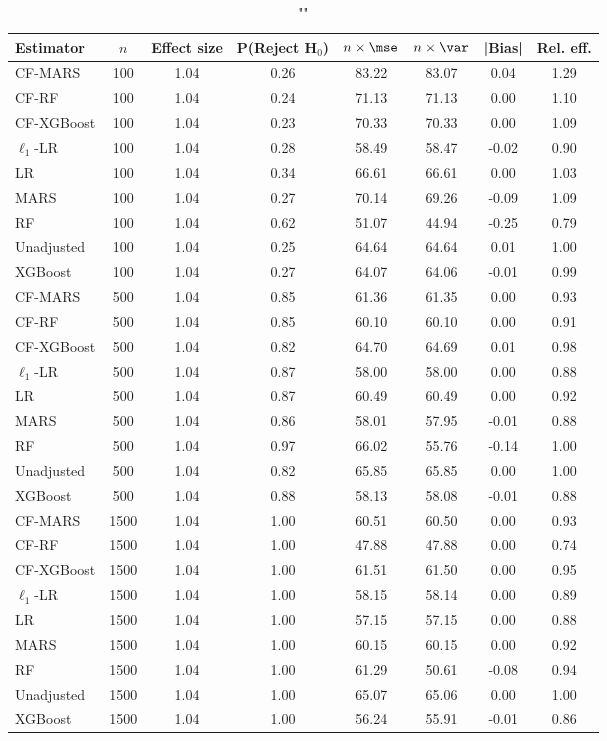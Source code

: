 
\begin{table}
\centering
\caption{""}
\begin{tabular}{lccccccc}
\toprule
Estimator & $n$ & Effect size & P(Reject H$_0$) & $n\times\mse$ & $n\times \var$ & |Bias| & Rel. eff.\\ \midrule
CF-MARS & 100 & 1.04 & 0.26 & 83.22 & 83.07 &  0.04 & 1.29 \\ 
CF-RF & 100 & 1.04 & 0.24 & 71.13 & 71.13 &  0.00 & 1.10 \\ 
CF-XGBoost & 100 & 1.04 & 0.23 & 70.33 & 70.33 &  0.00 & 1.09 \\ 
$\ell_1$-LR & 100 & 1.04 & 0.28 & 58.49 & 58.47 & -0.02 & 0.90 \\ 
LR & 100 & 1.04 & 0.34 & 66.61 & 66.61 &  0.00 & 1.03 \\ 
MARS & 100 & 1.04 & 0.27 & 70.14 & 69.26 & -0.09 & 1.09 \\ 
RF & 100 & 1.04 & 0.62 & 51.07 & 44.94 & -0.25 & 0.79 \\ 
Unadjusted & 100 & 1.04 & 0.25 & 64.64 & 64.64 &  0.01 & 1.00 \\ 
XGBoost & 100 & 1.04 & 0.27 & 64.07 & 64.06 & -0.01 & 0.99 \\ \addlinespace 
CF-MARS & 500 & 1.04 & 0.85 & 61.36 & 61.35 &  0.00 & 0.93 \\ 
CF-RF & 500 & 1.04 & 0.85 & 60.10 & 60.10 &  0.00 & 0.91 \\ 
CF-XGBoost & 500 & 1.04 & 0.82 & 64.70 & 64.69 &  0.01 & 0.98 \\ 
$\ell_1$-LR & 500 & 1.04 & 0.87 & 58.00 & 58.00 &  0.00 & 0.88 \\ 
LR & 500 & 1.04 & 0.87 & 60.49 & 60.49 &  0.00 & 0.92 \\ 
MARS & 500 & 1.04 & 0.86 & 58.01 & 57.95 & -0.01 & 0.88 \\ 
RF & 500 & 1.04 & 0.97 & 66.02 & 55.76 & -0.14 & 1.00 \\ 
Unadjusted & 500 & 1.04 & 0.82 & 65.85 & 65.85 &  0.00 & 1.00 \\ 
XGBoost & 500 & 1.04 & 0.88 & 58.13 & 58.08 & -0.01 & 0.88 \\ \addlinespace 
CF-MARS & 1500 & 1.04 & 1.00 & 60.51 & 60.50 &  0.00 & 0.93 \\ 
CF-RF & 1500 & 1.04 & 1.00 & 47.88 & 47.88 &  0.00 & 0.74 \\ 
CF-XGBoost & 1500 & 1.04 & 1.00 & 61.51 & 61.50 &  0.00 & 0.95 \\ 
$\ell_1$-LR & 1500 & 1.04 & 1.00 & 58.15 & 58.14 &  0.00 & 0.89 \\ 
LR & 1500 & 1.04 & 1.00 & 57.15 & 57.15 &  0.00 & 0.88 \\ 
MARS & 1500 & 1.04 & 1.00 & 60.15 & 60.15 &  0.00 & 0.92 \\ 
RF & 1500 & 1.04 & 1.00 & 61.29 & 50.61 & -0.08 & 0.94 \\ 
Unadjusted & 1500 & 1.04 & 1.00 & 65.07 & 65.06 &  0.00 & 1.00 \\ 
XGBoost & 1500 & 1.04 & 1.00 & 56.24 & 55.91 & -0.01 & 0.86 \\
\bottomrule
\end{tabular}
\end{table}

